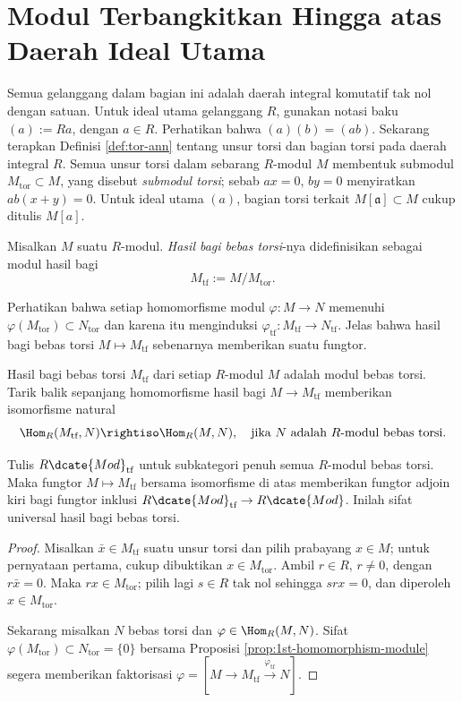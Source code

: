 \section{Modul Terbangkitkan Hingga atas Daerah Ideal Utama}\label{sec:PID-module}
Semua gelanggang dalam bagian ini adalah daerah integral komutatif tak nol dengan satuan. Untuk ideal utama gelanggang $R$, gunakan notasi baku $(a) := Ra$, dengan $a \in R$. Perhatikan bahwa $(a)(b) = (ab)$. Sekarang terapkan Definisi \ref{def:tor-ann} tentang unsur torsi dan bagian torsi pada daerah integral $R$. Semua unsur torsi dalam sebarang $R$-modul $M$ membentuk submodul $M_\text{tor} \subset M$, yang disebut \emph{submodul torsi}; sebab $ax=0$, $by=0$ menyiratkan $ab(x+y)=0$. Untuk ideal utama $(a)$, bagian torsi terkait $M[\mathfrak{a}] \subset M$ cukup ditulis $M[a]$.

\begin{definition}
	Misalkan $M$ suatu $R$-modul. \emph{Hasil bagi bebas torsi}-nya didefinisikan sebagai modul hasil bagi 
	\[ M_\text{tf} := M/M_\text{tor}. \]
\end{definition}
Perhatikan bahwa setiap homomorfisme modul $\varphi: M \to N$ memenuhi $\varphi(M_\text{tor}) \subset N_\text{tor}$ dan karena itu menginduksi $\varphi_\text{tf}: M_\text{tf} \to N_\text{tf}$. Jelas bahwa hasil bagi bebas torsi $M \mapsto M_\text{tf}$ sebenarnya memberikan suatu fungtor.

\begin{lemma}
	Hasil bagi bebas torsi $M_\text{tf}$ dari setiap $R$-modul $M$ adalah modul bebas torsi. Tarik balik sepanjang homomorfisme hasil bagi $M \to M_\text{tf}$ memberikan isomorfisme natural
	\[ \Hom_R(M_\text{tf}, N) \rightiso \Hom_R(M, N), \quad \text{jika $N$ adalah $R$-modul bebas torsi.} \]
\end{lemma}
Tulis $R\dcate{Mod}_\text{tf}$ untuk subkategori penuh semua $R$-modul bebas torsi. Maka fungtor $M \mapsto M_\text{tf}$ bersama isomorfisme di atas memberikan fungtor adjoin kiri bagi fungtor inklusi $R\dcate{Mod}_\text{tf} \to R\dcate{Mod}$. Inilah sifat universal hasil bagi bebas torsi.

\begin{proof}
	Misalkan $\bar{x} \in M_\text{tf}$ suatu unsur torsi dan pilih prabayang $x \in M$; untuk pernyataan pertama, cukup dibuktikan $x \in M_\text{tor}$. Ambil $r \in R$, $r \neq 0$, dengan $r\bar{x} = 0$. Maka $rx \in M_\text{tor}$; pilih lagi $s \in R$ tak nol sehingga $srx=0$, dan diperoleh $x \in M_\text{tor}$.

	Sekarang misalkan $N$ bebas torsi dan $\varphi \in \Hom_R(M, N)$. Sifat $\varphi(M_\text{tor}) \subset N_\text{tor} = \{0\}$ bersama Proposisi \ref{prop:1st-homomorphism-module} segera memberikan faktorisasi $\varphi = [M \to M_\text{tf} \xrightarrow{\varphi_\text{tf}} N]$.
\end{proof}

